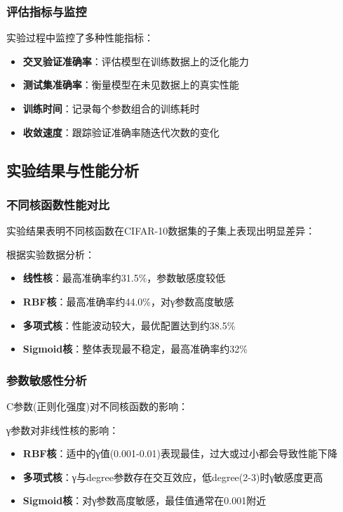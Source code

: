 \documentclass[UTF8]{report}
\theoremstyle{MyLineTheoremStyle} %
\theoremstyle{MyBlockTheoremStyle} %
\theoremstyle{MySubsubsectionStyle} %
\begin{document}
\subsubsection{评估指标与监控}
实验过程中监控了多种性能指标：

\begin{itemize}
    \item \textbf{交叉验证准确率}：评估模型在训练数据上的泛化能力
    \item \textbf{测试集准确率}：衡量模型在未见数据上的真实性能
    \item \textbf{训练时间}：记录每个参数组合的训练耗时
    \item \textbf{收敛速度}：跟踪验证准确率随迭代次数的变化
\end{itemize}

\subsection{实验结果与性能分析}

\subsubsection{不同核函数性能对比}

实验结果表明不同核函数在CIFAR-10数据集的子集上表现出明显差异：

根据实验数据分析：
\begin{itemize}
    \item \textbf{线性核}：最高准确率约31.5\%，参数敏感度较低
    \item \textbf{RBF核}：最高准确率约44.0\%，对γ参数高度敏感
    \item \textbf{多项式核}：性能波动较大，最优配置达到约38.5\%
    \item \textbf{Sigmoid核}：整体表现最不稳定，最高准确率约32\%
\end{itemize}

\subsubsection{参数敏感性分析}

C参数(正则化强度)对不同核函数的影响：

γ参数对非线性核的影响：
\begin{itemize}
    \item \textbf{RBF核}：适中的γ值(0.001-0.01)表现最佳，过大或过小都会导致性能下降
    \item \textbf{多项式核}：γ与degree参数存在交互效应，低degree(2-3)时γ敏感度更高
    \item \textbf{Sigmoid核}：对γ参数高度敏感，最佳值通常在0.001附近
\end{itemize}
\end{document}

